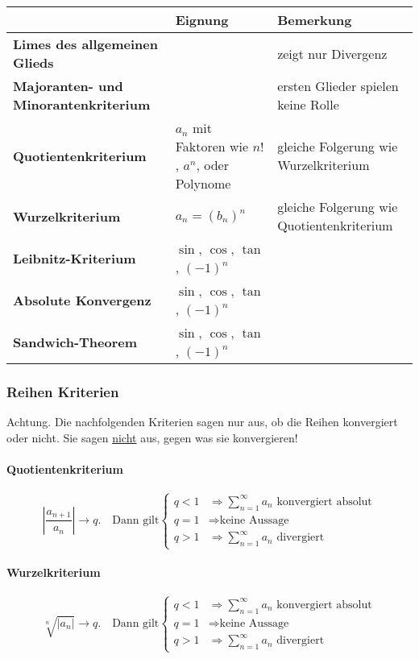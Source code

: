 \begin{table}[H]
	\centering
	\begin{tabular}{|p{4.5cm}|p{3.5cm}|p{4.3cm}|}
		\hline
		& \textbf{Eignung}    & \textbf{Bemerkung}                        \\ \hline
		\textbf{Limes des allgemeinen Glieds}        &                     & zeigt nur Divergenz                       \\ \hline
		\textbf{Majoranten- und Minorantenkriterium} &                     & ersten Glieder spielen keine Rolle        \\ \hline
		\textbf{Quotientenkriterium}                 & $a_n$ mit Faktoren wie $n!$, $a^n$, oder Polynome & gleiche Folgerung wie Wurzelkriterium     \\ \hline
		\textbf{Wurzelkriterium}                     & $a_n = (b_n)^n$     & gleiche Folgerung wie Quotientenkriterium \\ \hline
		\textbf{Leibnitz-Kriterium}                  & $\sin$, $\cos$, $\tan$, $(-1)^n$ &                                           \\ \hline
		\textbf{Absolute Konvergenz}                 & $\sin$, $\cos$, $\tan$, $(-1)^n$   &                                           \\ \hline
		\textbf{Sandwich-Theorem}					 & $\sin$, $\cos$, $\tan$, $(-1)^n$ & \\ \hline
	\end{tabular}
\end{table}
\subsubsection{Reihen Kriterien}
Achtung. Die nachfolgenden Kriterien sagen nur aus, ob die Reihen konvergiert
oder nicht. Sie sagen \underline{nicht} aus, gegen was sie konvergieren!

\paragraph{Quotientenkriterium}
\[
\left| \frac{a_{n+1}}{a_n} \right| \to q. \quad \text{Dann gilt} \begin{cases}
q < 1 & \Rightarrow \sum_{n=1}^\infty a_n \text{ konvergiert absolut} \\
q = 1 & \Rightarrow \text{keine Aussage}\\
q > 1 & \Rightarrow \sum_{n=1}^\infty a_n \text{ divergiert}
\end{cases}
\]

\paragraph{Wurzelkriterium}
\[
\sqrt[n]{\left | a_n \right |} \to q. \quad \text{Dann gilt} \begin{cases}
q < 1 & \Rightarrow \sum_{n=1}^\infty a_n \text{ konvergiert absolut}\\
q = 1 & \Rightarrow \text{keine Aussage}\\
q > 1 & \Rightarrow \sum_{n=1}^\infty a_n \text{ divergiert}
\end{cases}
\]

